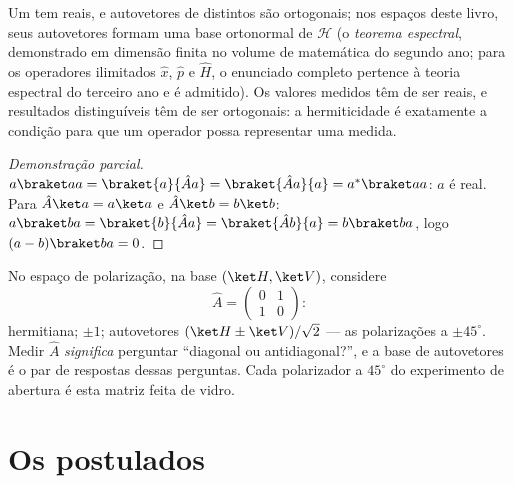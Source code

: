 \begin{theorem}\label{thm:b3:quantum-formalism:hermitian}
Um  tem  reais, e autovetores de
 distintos são ortogonais; nos espaços deste livro, seus
autovetores formam uma base ortonormal de $\mathcal H$ (o
\emph{teorema espectral}, demonstrado em dimensão finita no volume de
matemática do segundo ano; para os operadores ilimitados $\hat x$,
$\hat p$ e $\hat H$, o enunciado completo pertence à teoria espectral
do terceiro ano e é admitido). Os valores medidos têm de ser reais, e
resultados distinguíveis têm de ser ortogonais: a hermiticidade é
exatamente a condição para que um operador possa representar uma
medida.
\end{theorem}

\begin{proof}[Demonstração parcial]
$a\braket aa = \braket{a}{\hat Aa} = \braket{\hat Aa}{a} =
a^*\braket aa$: $a$ é real. Para $\hat A\ket a = a\ket a$ e $\hat A\ket b
= b\ket b$: $a\braket ba = \braket{b}{\hat Aa} = \braket{\hat
Ab}{a} = b\braket ba$, logo $(a - b)\braket ba = 0$.
\end{proof}

\begin{example}\label{ex:b3:quantum-formalism:twolevel}
No espaço de polarização, na base $(\ket H, \ket V)$, considere
\[
\hat A = \begin{pmatrix} 0 & 1\\ 1 & 0\end{pmatrix} :
\]
hermitiana;  $\pm1$; autovetores $(\ket H \pm
\ket V)/\sqrt2$ --- as polarizações a $\pm45^\circ$. Medir
$\hat A$ \emph{significa} perguntar ``diagonal ou antidiagonal?'', e a
base de autovetores é o par de respostas dessas perguntas. Cada
polarizador a $45^\circ$ do experimento de abertura é esta matriz feita
de vidro.
\end{example}

\section{Os postulados}

